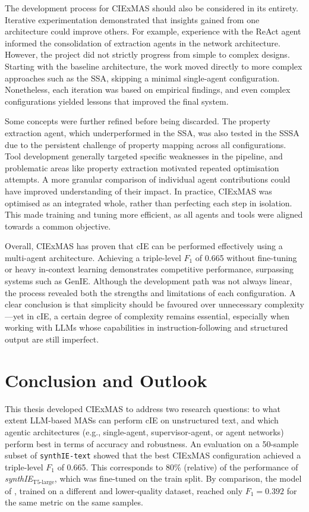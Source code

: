 \documentclass[a4paper,oneside,bibliography=totoc]{scrbook}
\begin{document}
The development process for CIExMAS should also be considered in its entirety. Iterative experimentation demonstrated that insights gained from one architecture could improve others. For example, experience with the ReAct agent informed the consolidation of extraction agents in the network architecture. However, the project did not strictly progress from simple to complex designs. Starting with the baseline architecture, the work moved directly to more complex approaches such as the \ac{SSA}, skipping a minimal single-agent configuration. Nonetheless, each iteration was based on empirical findings, and even complex configurations yielded lessons that improved the final system.

Some concepts were further refined before being discarded. The property extraction agent, which underperformed in the \ac{SSA}, was also tested in the \ac{SSSA} due to the persistent challenge of property mapping across all configurations. Tool development generally targeted specific weaknesses in the pipeline, and problematic areas like property extraction motivated repeated optimisation attempts. A more granular comparison of individual agent contributions could have improved understanding of their impact. In practice, CIExMAS was optimised as an integrated whole, rather than perfecting each step in isolation. This made training and tuning more efficient, as all agents and tools were aligned towards a common objective.

Overall, CIExMAS has proven that \ac{cIE} can be performed effectively using a multi-agent architecture. Achieving a triple-level $F_{1}$ of 0.665 without fine-tuning or heavy in-context learning demonstrates competitive performance, surpassing systems such as GenIE. Although the development path was not always linear, the process revealed both the strengths and limitations of each configuration. A clear conclusion is that simplicity should be favoured over unnecessary complexity—yet in \ac{cIE}, a certain degree of complexity remains essential, especially when working with \acp{LLM} whose capabilities in instruction-following and structured output are still imperfect.

\chapter{Conclusion and Outlook}
\label{ch:conclusion_outlook}

This thesis developed CIExMAS to address two research questions: to what extent \ac{LLM}-based \acp{MAS} can perform \ac{cIE} on unstructured text, and which agentic architectures (e.g., single-agent, supervisor-agent, or agent networks) perform best in terms of accuracy and robustness. An evaluation on a 50-sample subset of \texttt{synthIE-text} showed that the best CIExMAS configuration achieved a triple-level $F_{1}$ of 0.665. This corresponds to 80\% (relative) of the performance of \textit{synthIE}$_{\text{T5-large}}$, which was fine-tuned on the train split. By comparison, the model of \citet{Josifoski2021}, trained on a different and lower-quality dataset, reached only $F_{1}=0.392$ for the same metric on the same samples.
\end{document}
